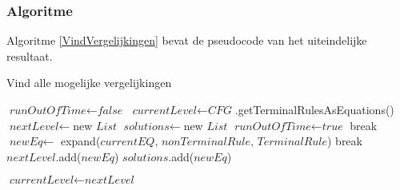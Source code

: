 \documentclass[Main.tex]{subfiles}
\begin{document}
\subsubsection*{Algoritme}
Algoritme \ref{VindVergelijkingen} bevat de pseudocode van het uiteindelijke resultaat.
\begin{algorithm}[!htb]
\caption{Vind alle mogelijke vergelijkingen}
\label{VindVergelijkingen}
\begin{algorithmic}[1]
\State $\textit{runOutOfTime} \gets \textit{false}$
\State $\textit{currentLevel} \gets \textit{CFG}$.getTerminalRulesAsEquations()
\State $\textit{nextLevel} \gets$new $\textit{List}$
\State $\textit{solutions} \gets$new $\textit{List}$
			\State $\textit{runOutOfTime} \gets \textit{true}$
			\State break
		\EndIf
				\State $\textit{newEq} \gets$ expand($\textit{currentEQ, nonTerminalRule, TerminalRule}$)
					\State break
					\State $\textit{nextLevel}$.add($\textit{newEq}$)
						\State $\textit{solutions}$.add($\textit{newEq}$)
					\EndIf
				\EndIf

			\EndFor
		\EndFor
	\EndFor
	\State $\textit{currentLevel} \gets \textit{nextLevel}$
\EndWhile
\EndProcedure
\end{algorithmic}
\end{algorithm}
\end{document}
